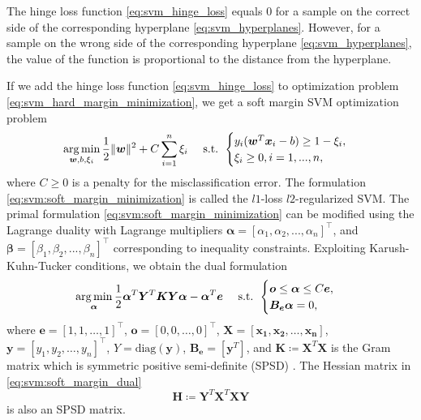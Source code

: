 The hinge loss function \eqref{eq:svm_hinge_loss} equals $0$ for a sample on the correct side of the corresponding hyperplane \eqref{eq:svm_hyperplanes}. However, for a sample on the wrong side of the corresponding hyperplane \eqref{eq:svm_hyperplanes}, the value of the function is proportional to the distance from the hyperplane.

If we add the hinge loss function \eqref{eq:svm_hinge_loss} to optimization problem \eqref{eq:svm_hard_margin_minimization}, we get a soft margin SVM optimization problem
\begin{equation}
    \operatorname*{arg\,min}_{\boldsymbol{w},b,\xi_i} \frac{1}{2}\|\boldsymbol{w}\|^2 + C\sum_{i = 1}^n\xi_i\quad \text{ s.t. }
    \begin{cases}
        y_i(\boldsymbol{w}^T\boldsymbol{x}_i-b)\geq1 - \xi_i,\\
        \xi_i \geq 0 , i=1, ...,n,
    \end{cases}
    \label{eq:svm:soft_margin_minimization}
\end{equation}
where \( C \geq 0 \) is a penalty for the misclassification error. The formulation \eqref{eq:svm:soft_margin_minimization} is called the $l1$-loss $l2$-regularized SVM. The primal formulation \eqref{eq:svm:soft_margin_minimization} can be modified using the Lagrange duality with Lagrange multipliers $\boldsymbol{\alpha} = [\alpha_1, \alpha_2, ..., \alpha_n]^{\top}$, and $\boldsymbol{\beta} = [\beta_1, \beta_2, ..., \beta_n]^{\top}$ corresponding to inequality constraints. Exploiting Karush-Kuhn-Tucker conditions, we obtain the dual formulation
\begin{equation}
    \operatorname*{arg\,min}_{\boldsymbol{\alpha}} \frac{1}{2} \boldsymbol{\alpha}^T\boldsymbol{Y}^T\boldsymbol{K}\boldsymbol{Y}\boldsymbol{\alpha} - \boldsymbol{\alpha}^T\boldsymbol{e}\quad \text{ s.t. } 
    \begin{cases}
        \boldsymbol{o} \leq \boldsymbol{\alpha} \leq C\boldsymbol{e},\\
        \boldsymbol{B_e}\boldsymbol{\alpha}=0,
    \end{cases}
    \label{eq:svm:soft_margin_dual}
\end{equation}
where \( \boldsymbol{e} = [1,1, \dots,1]^{\top} \), \( \boldsymbol{o} = [0,0, \dots,0]^{\top} \), \( \boldsymbol{X} = [\boldsymbol{x_1},\boldsymbol{x_2}, \dots,\boldsymbol{x_n}] \), \( \boldsymbol{y} = [y_1,y_2, \dots,y_n]^{\top} \), \( Y = \text{diag}(\boldsymbol{y}) \), \( \boldsymbol{B_e} = [\boldsymbol{y}^T] \), and \( \boldsymbol{K}\coloneqq\boldsymbol{X}^T\boldsymbol{X} \) is the Gram matrix which is symmetric positive semi-definite (SPSD) \cite{Aeta2018}. The Hessian matrix in \eqref{eq:svm:soft_margin_dual}
\begin{equation}
    \boldsymbol{H} \coloneqq \boldsymbol{Y}^T\boldsymbol{X}^T\boldsymbol{X}\boldsymbol{Y}
    \label{eq:svm:hessian}
\end{equation}
is also an SPSD matrix.

